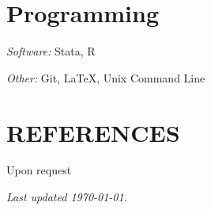 \documentclass[letterpaper]{article}
\renewenvironment{itemize}{
  \begin{list}{}{
    \setlength{\leftmargin}{1.5em}
  }
}{
  \end{list}
}
\begin{document}

\section*{Programming}

\begin{itemize}
    \item \textit{Software:} \hspace{10pt} Stata, R
    
    \item \textit{Other:} \hspace{22pt} Git, LaTeX, Unix Command Line 
\end{itemize}


\section*{REFERENCES}

\begin{itemize}
    \item Upon request
\end{itemize}

\bigskip

\vfill 
\begin{itemize}
    \item \emph{Last updated {\today}.}
\end{itemize}
\end{document}
